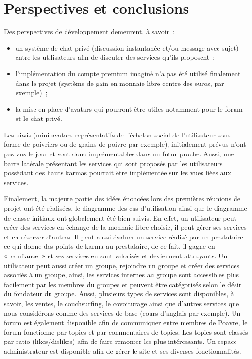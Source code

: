\chapter{Perspectives et conclusions}

Des perspectives de développement demeurent, à savoir~:
\begin{itemize}
    \item un système de chat privé (discussion instantanée et/ou message avec sujet) entre les utilisateurs afin de discuter des services qu'ils proposent~;
    \item l'implémentation du compte premium imaginé n'a pas été utilisé finalement dans le projet (système de gain en monnaie libre contre des euros, par exemple)~;
    \item la mise en place d'avatars qui pourront être utiles notamment pour le forum et le chat privé.
\end{itemize}

Les kiwis (mini-avatars représentatifs de l'échelon social de l'utilisateur sous forme de poivriers ou de grains de poivre par exemple), initialement prévus n'ont pas vus le jour et sont donc implémentables dans un futur proche. Aussi, une barre latérale présentant les services qui sont proposés par les utilisateurs possédant des hauts karmas pourrait être implémentée sur les vues liées aux services.

Finalement, la majeure partie des idées énoncées lors des premières réunions de projet ont été réalisées, le diagramme des cas d'utilisation ainsi que le diagramme de classe initiaux ont globalement été bien suivis.
En effet, un utilisateur peut créer des services en échange de la monnaie libre choisie, il peut gérer ses services et en réserver d'autres.
Il peut aussi évaluer un service réalisé par un prestataire ce qui donne des points de karma au prestataire, de ce fait, il gagne en «~confiance~» et ses services en sont valorisés et deviennent attrayants.
Un utilisateur peut aussi créer un groupe, rejoindre un groupe et créer des services associés à un groupe, ainsi, les services internes au groupe sont accessibles plus facilement par les membres du groupes et peuvent être catégorisés selon le désir du fondateur du groupe.
Aussi, plusieurs types de services sont disponibles, à savoir, les ventes, le couchsurfing, le covoiturage ainsi que d'autres services que nous considérons comme des services de base (cours d'anglais par exemple).
Un forum est également disponible afin de communiquer entre membres de Poavre, le forum fonctionne par topics et par commentaires de topics. Les topics sont classés par ratio (likes/dislikes) afin de faire remonter les plus intéressants.
Un espace administrateur est disponible afin de gérer le site et ses diverses fonctionnalités.
